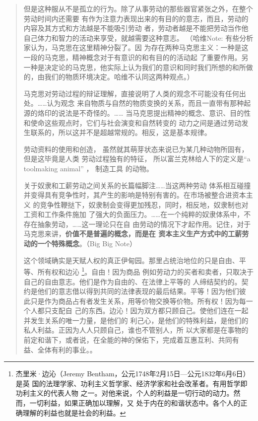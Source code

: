 \begin{quotation}
但是这种服从不是孤立的行为。除了从事劳动的那些器官紧张之外，在整个劳动时间内还需要
有作为注意力表现出来的有目的的意志，而且，劳动的内容及其方式和方法越是不能吸引劳动
者，劳动者越是不能把劳动当作他自己体力和智力的活动来享受，就越需要这种意志。
 （哈维Note: 有些分析家认为，马克思在这里精神分裂了。因
为存在两种马克思主义：一种是这一段的马克思，精神概念对于有意识的和有目的的活动起
了重要作用。另一种是决定论的马克思，他实际上认为我们的意识和同时我们所想的和所做
的，由我们的物质环境决定。哈维不认同这两种观点。） 

马克思对劳动过程的辩证理解，直接说明了人类的观念不可能没有任何出处。……认为观念
来自物质与自然的物质变换的关系，而且一直带有那种起源的烙印的说法是不奇怪的。……
当马克思提出精神的概念、意识、目的性和使命这些观点时，它们与社会演变和自然转变的
动力之间是通过劳动发生联系的，所以这并不是超越常规的。相反，这是基本规律。



劳动资料的使用和创造， 虽然就其萌芽状态来说已为某几种动物所固有， 但是这毕竟是人类
劳动过程独有的特征， 所以富兰克林给人下的定义是“a toolmaking animal” ， 制造工具
的动物。 

关于奴隶和工薪劳动之间关系的长篇幅脚注……当这两种劳动
体系相互碰撞并变得具有竞争性时，其产生的影响是特别有害的。在市场被整合进资本主义
的竞争性鞭挞下，奴隶制会变得更加残忍，同时，相反地，奴隶制也对工资和工作条件施加
了强大的负面压力。……在一个纯粹的奴隶体系中，不存在抽象劳动，……这一理论只在自
由劳动的情况下才起作用。记住，对于马克思来讲，\textbf{价值不是普遍的概念，而是在
  资本主义生产方式中的工薪劳动的一个特殊概念}。（Big Big Note）


这个领域确实是天赋人权的真正伊甸园。那里占统治地位的只是自由、平等、所有权和边沁
\footnote{杰里米·边沁（Jeremy Bentham，公元1748年2月15日—公元1832年6月6日）是英
国的法理学家、功利主义哲学家、经济学家和社会改革者。有用哲学即功利主义的代表人物
之一。对他来说，个人的利益是一切行动的动力。然而，一切利益，如果正确加以理解，又
处于内在的和谐状态中。各个人的正确理解的利益也就是社会的利益。}。自由！因为商品
例如劳动力的买者和卖者，只取决于自己的自由意志。他们是作为自由的、在法律上平等的
人缔结契约的。契约是他们的意志借以得到共同的法律表现的最后结果。平等！因为他们彼
此只是作为商品占有者发生关系，用等价物交换等价物。所有权！因为每一个人都只支配自
己的东西。边沁！因为双方都只顾自己。使他们连在一起并发生关系的唯一力量，是他们的
利己心，是他们的特殊利益，是他们的私人利益。正因为人人只顾自己，谁也不管别人，所
以大家都是在事物的前定和谐下，或者说，在全能的神的保佑下，完成着互惠互利、共同有
益、全体有利的事业。。


\end{quotation}
